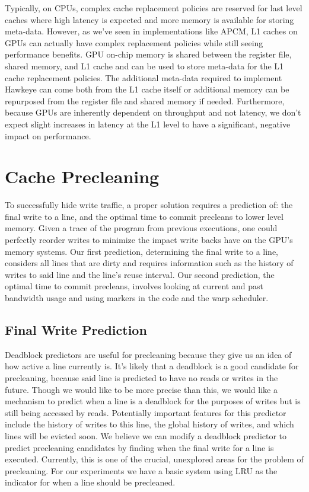 Typically, on CPUs, complex cache replacement policies are reserved for last level caches where high latency is expected and more memory is available for storing meta-data. However, as we’ve seen in implementations like APCM, L1 caches on GPUs can actually have complex replacement policies while still seeing performance benefits. GPU on-chip memory is shared between the register file, shared memory, and L1 cache and can be used to store meta-data for the L1 cache replacement policies. The additional meta-data required to implement Hawkeye can come both from the L1 cache itself or additional memory can be repurposed from the register file and shared memory if needed. Furthermore, because GPUs are inherently dependent on throughput and not latency, we don't expect slight increases in latency at the L1 level to have a significant, negative impact on performance.

\section{Cache Precleaning}

To successfully hide write traffic, a proper solution requires a prediction of: the final write to a line, and the optimal time to commit precleans to lower level memory. Given a trace of the program from previous executions, one could perfectly reorder writes to minimize the impact write backs have on the GPU's memory systems. Our first prediction, determining the final write to a line, considers all lines that are dirty and requires information such as the history of writes to said line and the line's reuse interval. Our second prediction, the optimal time to commit precleans, involves looking at current and past bandwidth usage and using markers in the code and the warp scheduler.

\subsection{Final Write Prediction}
Deadblock predictors are useful for precleaning because they give us an idea of how active a line currently is. It's likely that a deadblock is a good candidate for precleaning, because said line is predicted to have no reads or writes in the future. Though we would like to be more precise than this, we would like a mechanism to predict when a line is a deadblock for the purposes of writes but is still being accessed by reads. Potentially important features for this predictor include the history of writes to this line, the global history of writes, and which lines will be evicted soon. We believe we can modify a deadblock predictor to predict precleaning candidates by finding when the final write for a line is executed. Currently, this is one of the crucial, unexplored areas for the problem of precleaning. For our experiments we have a basic system using LRU as the indicator for when a line should be precleaned.

